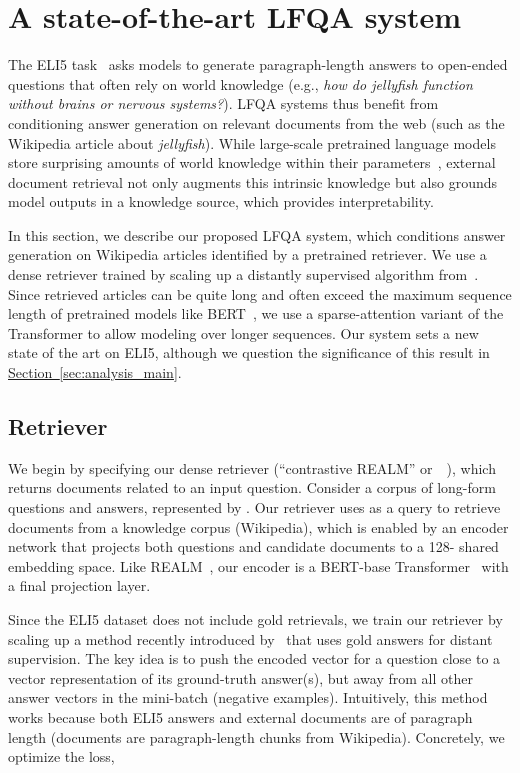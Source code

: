\documentclass[11pt]{article}
\newcommand{\namedref}[2]{\hyperref[#2]{#1~\ref*{#2}}}
\newcommand{\sectionref}[1]{\namedref{Section}{#1}}
\newcommand{\retriever}[1]{\textsc{c-REALM}}
\begin{document}
 \section{A state-of-the-art LFQA system}\label{sec:model}
The ELI5 task~\citep{fan-etal-2019-eli5} asks models to generate paragraph-length answers to open-ended questions that often rely on world knowledge (e.g., \textit{how do jellyfish function without brains or nervous systems?}). LFQA systems thus benefit from conditioning answer generation on relevant documents from the web (such as the Wikipedia article about \textit{jellyfish}). While large-scale pretrained language models store surprising amounts of world knowledge within their parameters~\citep{petroni2019language, roberts2020much}, external document retrieval not only augments this intrinsic knowledge but also grounds model outputs in a knowledge source, which provides interpretability.

In this section, we describe our proposed LFQA system, which conditions answer generation on Wikipedia articles identified by a pretrained retriever. We use a dense retriever trained by scaling up a distantly supervised algorithm from~\citet{jernite2020}. Since retrieved articles can be quite long and often exceed the maximum sequence length of pretrained models like BERT~\citep{devlin-etal-2019-bert}, we use a sparse-attention variant of the Transformer to allow modeling over longer sequences. Our system sets a new state of the art on ELI5, although we question the significance of this result in \sectionref{sec:analysis_main}.

\subsection{Retriever}
We begin by specifying our dense retriever (``contrastive REALM'' or~\retriever~), which returns documents related to an input question.
Consider a corpus of long-form questions and answers, represented by . Our retriever uses  as a query to retrieve  documents  from a knowledge corpus (Wikipedia), which is enabled by an encoder network that projects both questions and candidate documents to a 128- shared embedding space. Like REALM~\citep{guu2020realm}, our encoder is a BERT-base Transformer~\citep{devlin-etal-2019-bert} with a final projection layer. 

Since the ELI5 dataset does not include gold retrievals, we train our retriever by scaling up a method recently introduced by~\citet{jernite2020} that uses gold answers for distant supervision. The key idea is to push the encoded vector for a question close to a vector representation of its ground-truth answer(s), but away from all other answer vectors in the mini-batch (negative examples). Intuitively, this method works because both ELI5 answers and external documents are of paragraph length (documents are paragraph-length chunks from Wikipedia). Concretely, we optimize the loss,
\end{document}
